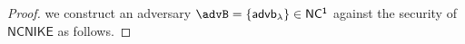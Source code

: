 \begin{proof}
%		
%		 
%		
%		
	we construct an adversary $\advB = \{\advb\} \in \ncone$ against the security of $\mathsf{NCNIKE}$ as follows.
	

\end{proof}

